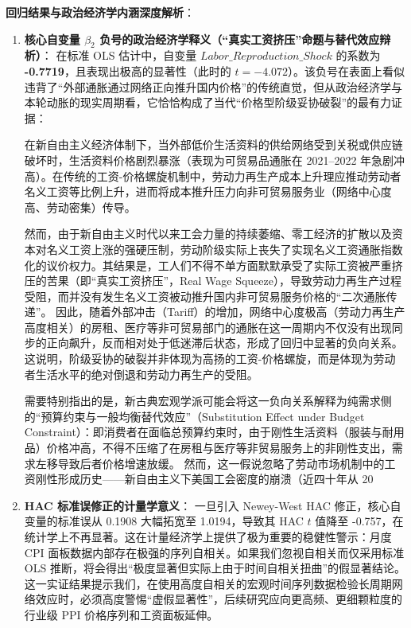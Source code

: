 \documentclass[UTF8,a4paper,11pt]{ctexart}
\begin{document}
\noindent\textbf{回归结果与政治经济学内涵深度解析}：
\begin{enumerate}
    \item \textbf{核心自变量 $\beta_2$ 负号的政治经济学释义（“真实工资挤压”命题与替代效应辩析）}：
    在标准 OLS 估计中，自变量 $Labor\_Reproduction\_Shock$ 的系数为 \textbf{-0.7719}，且表现出极高的显著性（此时的 $t = -4.072$）。该负号在表面上看似违背了“外部通胀通过网络正向推升国内价格”的传统直觉，但从政治经济学与本轮动胀的现实周期看，它恰恰构成了当代“价格型阶级妥协破裂”的最有力证据：
    
    在新自由主义经济体制下，当外部低价生活资料的供给网络受到关税或供应链破坏时，生活资料价格剧烈暴涨（表现为可贸易品通胀在 2021--2022 年急剧冲高）。在传统的工资-价格螺旋机制中，劳动力再生产成本上升理应推动劳动者名义工资等比例上升，进而将成本推升压力向非可贸易服务业（网络中心度高、劳动密集）传导。
    
    然而，由于新自由主义时代以来工会力量的持续萎缩、零工经济的扩散以及资本对名义工资上涨的强硬压制，劳动阶级实际上丧失了实现名义工资通胀指数化的议价权力。其结果是，工人们不得不单方面默默承受了实际工资被严重挤压的苦果（即“真实工资挤压”，Real Wage Squeeze），导致劳动力再生产过程受阻，而并没有发生名义工资被动推升国内非可贸易服务价格的“二次通胀传递”。
    因此，随着外部冲击（Tariff）的增加，网络中心度极高（劳动力再生产高度相关）的房租、医疗等非可贸易部门的通胀在这一周期内不仅没有出现同步的正向飙升，反而相对处于低迷滞后状态，形成了回归中显著的负向关系。这说明，阶级妥协的破裂并非体现为高扬的工资-价格螺旋，而是体现为劳动者生活水平的绝对倒退和劳动力再生产的受阻。

    需要特别指出的是，新古典宏观学派可能会将这一负向关系解释为纯需求侧的“预算约束与一般均衡替代效应”（Substitution Effect under Budget Constraint）：即消费者在面临总预算约束时，由于刚性生活资料（服装与耐用品）价格冲高，不得不压缩了在房租与医疗等非贸易服务上的非刚性支出，需求左移导致后者价格增速放缓。
    然而，这一假说忽略了劳动市场机制中的工资刚性形成历史——新自由主义下美国工会密度的崩溃（近四十年从 20%
    
    \item \textbf{HAC 标准误修正的计量学意义}：
    一旦引入 Newey-West HAC 修正，核心自变量的标准误从 0.1908 大幅拓宽至 1.0194，导致其 HAC $t$ 值降至 -0.757，在统计学上不再显著。这在计量经济学上提供了极为重要的稳健性警示：月度 CPI 面板数据内部存在极强的序列自相关。如果我们忽视自相关而仅采用标准 OLS 推断，将会得出“极度显著但实际上由于时间自相关扭曲”的假显著结论。
    这一实证结果提示我们，在使用高度自相关的宏观时间序列数据检验长周期网络效应时，必须高度警惕“虚假显著性”，后续研究应向更高频、更细颗粒度的行业级 PPI 价格序列和工资面板延伸。
    

\end{enumerate}
\end{document}
